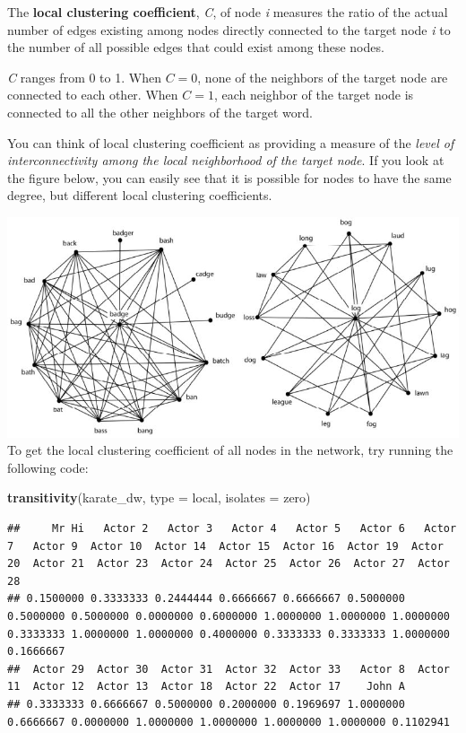 \documentclass[
]{book}
\newenvironment{Shaded}{\begin{snugshade}}{\end{snugshade}}
\newcommand{\AttributeTok}[1]{\textcolor[rgb]{0.13,0.29,0.53}{#1}}
\newcommand{\FunctionTok}[1]{\textcolor[rgb]{0.13,0.29,0.53}{\textbf{#1}}}
\newcommand{\NormalTok}[1]{#1}
\newcommand{\StringTok}[1]{\textcolor[rgb]{0.31,0.60,0.02}{#1}}
\begin{document}
The \textbf{local clustering coefficient}, \emph{C}, of node \emph{i} measures the ratio of the actual number of edges existing among nodes directly connected to the target node \emph{i} to the number of all possible edges that could exist among these nodes.

\emph{C} ranges from 0 to 1. When \(C = 0\), none of the neighbors of the target node are connected to each other. When \(C = 1\), each neighbor of the target node is connected to all the other neighbors of the target word.

You can think of local clustering coefficient as providing a measure of the \emph{level of interconnectivity among the local neighborhood of the target node}. If you look at the figure below, you can easily see that it is possible for nodes to have the same degree, but different local clustering coefficients.

\includegraphics{images/hcc-lcc.jpg}
To get the local clustering coefficient of all nodes in the network, try running the following code:

\begin{Shaded}
\begin{Highlighting}[]
\FunctionTok{transitivity}\NormalTok{(karate\_dw, }\AttributeTok{type =} \StringTok{\textquotesingle{}local\textquotesingle{}}\NormalTok{, }\AttributeTok{isolates =} \StringTok{\textquotesingle{}zero\textquotesingle{}}\NormalTok{)}
\end{Highlighting}
\end{Shaded}

\begin{verbatim}
##     Mr Hi   Actor 2   Actor 3   Actor 4   Actor 5   Actor 6   Actor 7   Actor 9  Actor 10  Actor 14  Actor 15  Actor 16  Actor 19  Actor 20  Actor 21  Actor 23  Actor 24  Actor 25  Actor 26  Actor 27  Actor 28 
## 0.1500000 0.3333333 0.2444444 0.6666667 0.6666667 0.5000000 0.5000000 0.5000000 0.0000000 0.6000000 1.0000000 1.0000000 1.0000000 0.3333333 1.0000000 1.0000000 0.4000000 0.3333333 0.3333333 1.0000000 0.1666667 
##  Actor 29  Actor 30  Actor 31  Actor 32  Actor 33   Actor 8  Actor 11  Actor 12  Actor 13  Actor 18  Actor 22  Actor 17    John A 
## 0.3333333 0.6666667 0.5000000 0.2000000 0.1969697 1.0000000 0.6666667 0.0000000 1.0000000 1.0000000 1.0000000 1.0000000 0.1102941
\end{verbatim}
\end{document}
